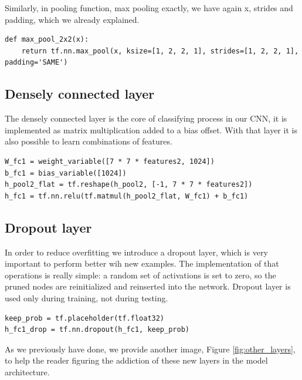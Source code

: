 Similarly, in pooling function, max pooling exactly, we have again x, strides and padding, which we already explained.

\begin{lstlisting}
def max_pool_2x2(x):
	return tf.nn.max_pool(x, ksize=[1, 2, 2, 1], strides=[1, 2, 2, 1], padding='SAME')
\end{lstlisting}

\subsection{Densely connected layer}

The densely connected layer is the core of classifying process in our \acs{CNN}, it is implemented as matrix multiplication added to a bias offset. With that layer it is also possible to learn combinations of features.

\begin{lstlisting}
W_fc1 = weight_variable([7 * 7 * features2, 1024])
b_fc1 = bias_variable([1024])
h_pool2_flat = tf.reshape(h_pool2, [-1, 7 * 7 * features2])
h_fc1 = tf.nn.relu(tf.matmul(h_pool2_flat, W_fc1) + b_fc1)
\end{lstlisting}

\subsection{Dropout layer}

In order to reduce overfitting we introduce a dropout layer, which is very important to perform better wih new examples. The implementation of that operations is really simple: a random set of activations is set to zero, so the pruned nodes are reinitialized and reinserted into the network. Dropout layer is used only during training, not during testing.

\begin{lstlisting}
keep_prob = tf.placeholder(tf.float32)
h_fc1_drop = tf.nn.dropout(h_fc1, keep_prob)
\end{lstlisting}

As we previously have done, we provide another image, Figure \ref{fig:other_layers}, to help the reader figuring the addiction of these new layers in the model architecture.

